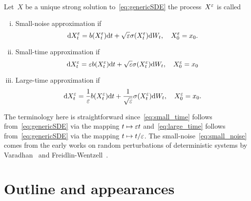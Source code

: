 \begin{definition}\label{def:LDP_approximation_types}
Let~$X$ be a unique strong solution to~\eqref{eq:genericSDE} the process~$X^\varepsilon$ is called
\begin{enumerate}[i)]
\item Small-noise approximation if 
\begin{equation}\label{eq:small_noise}
\mathrm{d} X_t^\varepsilon = b(X_t^\varepsilon) \mathrm{d} t + \sqrt{\varepsilon} \sigma(X_t^\varepsilon)\mathrm{d} W_t, \quad X_0^\varepsilon = x_0.
\end{equation}
\item Small-time approximation if 
\begin{equation}\label{eq:small_time}
\mathrm{d} X_t^\varepsilon = \varepsilon b(X_t^\varepsilon) \mathrm{d} t + \sqrt{\varepsilon} \sigma(X_t^\varepsilon) \mathrm{d} W_t, \quad X_0^\varepsilon = x_0
\end{equation}
\item Large-time approximation if 
\begin{equation}\label{eq:large_time}
\mathrm{d} X_t^\varepsilon = \frac{1}{\varepsilon} b(X_t^\varepsilon) \mathrm{d} t + \frac{1}{\sqrt{\varepsilon}} \sigma(X_t^\varepsilon) \mathrm{d} W_t, \quad X_0^\varepsilon = x_0.
\end{equation}
\end{enumerate}
\end{definition}
The terminology here is straightforward since~\eqref{eq:small_time} follows from~\eqref{eq:genericSDE} via the mapping $t \mapsto \varepsilon t$
and~\eqref{eq:large_time} follows from~\eqref{eq:genericSDE} via the mapping
$t\mapsto t/\varepsilon$.
The small-noise~\eqref{eq:small_noise}
comes from the early works 
on random perturbations of deterministic systems by Varadhan~\cite{Varadhan1967DiffusionInterval} and Freidlin-Wentzell~\cite{Freidlin2012RandomSystems}.


\section{Outline and appearances}


